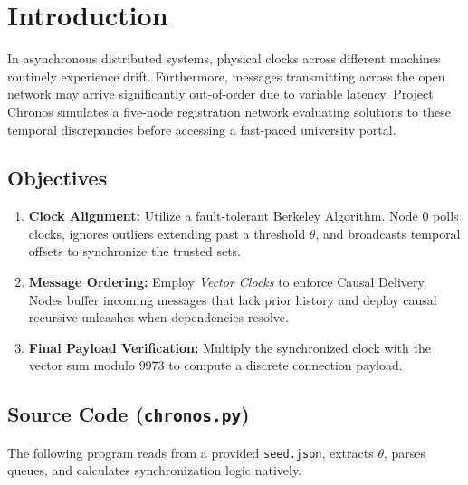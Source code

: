 \documentclass[11pt]{article}
\begin{document}
\section{Introduction}

In asynchronous distributed systems, physical clocks across different machines routinely experience drift. Furthermore, messages transmitting across the open network may arrive significantly out-of-order due to variable latency. Project Chronos simulates a five-node registration network evaluating solutions to these temporal discrepancies before accessing a fast-paced university portal. 

\subsection{Objectives}
\begin{enumerate}
    \item \textbf{Clock Alignment:} Utilize a fault-tolerant Berkeley Algorithm. Node 0 polls clocks, ignores outliers extending past a threshold $\theta$, and broadcasts temporal offsets to synchronize the trusted sets.
    \item \textbf{Message Ordering:} Employ \textit{Vector Clocks} to enforce Causal Delivery. Nodes buffer incoming messages that lack prior history and deploy causal recursive unleashes when dependencies resolve.
    \item \textbf{Final Payload Verification:} Multiply the synchronized clock with the vector sum modulo $9973$ to compute a discrete connection payload.
\end{enumerate}


\subsection{Source Code (\texttt{chronos.py})}

The following program reads from a provided \texttt{seed.json}, extracts $\theta$, parses queues, and calculates synchronization logic natively.
\end{document}
